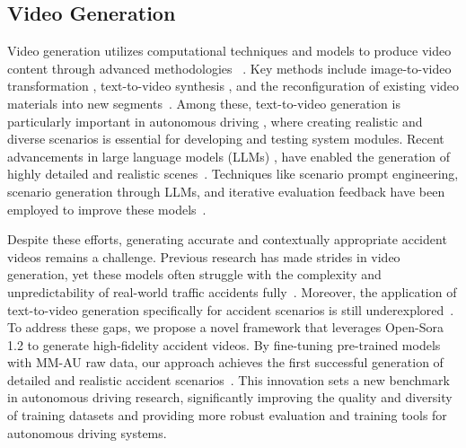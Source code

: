 \subsection{Video Generation}

Video generation utilizes computational techniques and models to produce video content through advanced methodologies ~\cite{vondrick2016generating,cai2018deep,huang2024vbench,chen2023pixart}. Key methods include image-to-video transformation \cite{hussain2017automatic,karras2023dreampose}, text-to-video synthesis \cite{karras2023dreampose}, and the reconfiguration of existing video materials into new segments~\cite{jiang2023text2performer}. Among these, text-to-video generation is particularly important in autonomous driving \cite{wen2024panacea,yuan2024magictime}, where creating realistic and diverse scenarios is essential for developing and testing system modules. Recent advancements in large language models (LLMs)
, have enabled the generation of highly detailed and realistic scenes~\cite{zhang2024ctrl, xu2024diffusion, gao2024scp, li2024fairdiff, gu2025text2street}.
 Techniques like scenario prompt engineering, scenario generation through LLMs, and iterative evaluation feedback have been employed to improve these models~\cite{chang2024llmscenario}.

Despite these efforts, generating accurate and contextually appropriate accident videos remains a challenge. Previous research has made strides in video generation, yet these models often struggle with the complexity and unpredictability of real-world traffic accidents fully~\cite{tulyakov2018mocogan,pang2021image}. Moreover, the application of text-to-video generation specifically for accident scenarios is still underexplored~\cite{denton2018stochastic}. To address these gaps, we propose a novel framework that leverages Open-Sora 1.2 to generate high-fidelity accident videos. By fine-tuning pre-trained models with MM-AU raw data, our approach achieves the first successful generation of detailed and realistic accident scenarios~\cite{gupta2018social}. This innovation sets a new benchmark in autonomous driving research, significantly improving the quality and diversity of training datasets and providing more robust evaluation and training tools for autonomous driving systems.